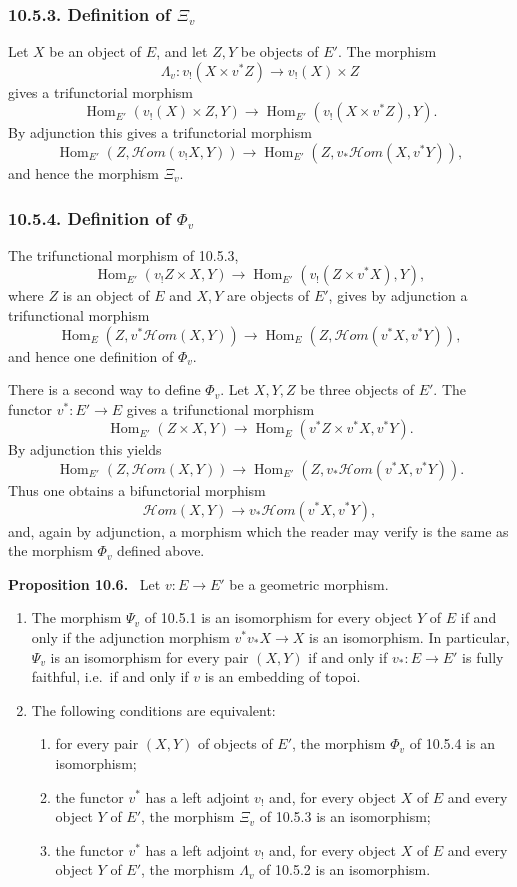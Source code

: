 \documentclass[11pt]{article}
\newcommand{\Hom}{\operatorname{Hom}}
\newcommand{\scrHom}{\mathscr{H}\!om}
\newcommand{\ie}{i.e.}
\newenvironment{statement}[1]{\par\medskip\noindent\textbf{#1.}\ }{\par\medskip}
\begin{document}
\subsubsection*{10.5.3. Definition of $\Xi_v$}
Let $X$ be an object of $E$, and let $Z,Y$ be objects of $E'$. The morphism
\[
\Lambda_v:v_!(X\times v^*Z)\to v_!(X)\times Z
\]
gives a trifunctorial morphism
\[
\Hom_{E'}(v_!(X)\times Z,Y)\longrightarrow
\Hom_{E'}(v_!(X\times v^*Z),Y).
\]
By adjunction this gives a trifunctorial morphism
\[
\Hom_{E'}(Z,\scrHom(v_!X,Y))\longrightarrow
\Hom_{E'}(Z,v_*\scrHom(X,v^*Y)),
\]
and hence the morphism $\Xi_v$.

\subsubsection*{10.5.4. Definition of $\Phi_v$}
The trifunctional morphism of 10.5.3,
\[
\Hom_{E'}(v_!Z\times X,Y)\longrightarrow \Hom_{E'}(v_!(Z\times v^*X),Y),
\]
where $Z$ is an object of $E$ and $X,Y$ are objects of $E'$, gives by adjunction a trifunctional morphism
\[
\Hom_E(Z,v^*\scrHom(X,Y))\longrightarrow
\Hom_E(Z,\scrHom(v^*X,v^*Y)),
\]
and hence one definition of $\Phi_v$.

There is a second way to define $\Phi_v$. Let $X,Y,Z$ be three objects of $E'$. The functor $v^*:E'\to E$ gives a trifunctional morphism
\[
\Hom_{E'}(Z\times X,Y)\longrightarrow
\Hom_E(v^*Z\times v^*X,v^*Y).
\]
By adjunction this yields
\[
\Hom_{E'}(Z,\scrHom(X,Y))\longrightarrow
\Hom_{E'}(Z,v_*\scrHom(v^*X,v^*Y)).
\]
Thus one obtains a bifunctorial morphism
\[
\scrHom(X,Y)\longrightarrow v_*\scrHom(v^*X,v^*Y),
\]
and, again by adjunction, a morphism which the reader may verify is the same as the morphism $\Phi_v$ defined above.

\begin{statement}{Proposition 10.6}
Let $v:E\to E'$ be a geometric morphism.
\begin{enumerate}[label=\arabic*)]
\item The morphism $\Psi_v$ of 10.5.1 is an isomorphism for every object $Y$ of $E$ if and only if the adjunction morphism $v^*v_*X\to X$ is an isomorphism. In particular, $\Psi_v$ is an isomorphism for every pair $(X,Y)$ if and only if $v_*:E\to E'$ is fully faithful, \ie\ if and only if $v$ is an embedding of topoi.
\item The following conditions are equivalent:
\begin{enumerate}[label=(\roman*)]
\item for every pair $(X,Y)$ of objects of $E'$, the morphism $\Phi_v$ of 10.5.4 is an isomorphism;
\item the functor $v^*$ has a left adjoint $v_!$ and, for every object $X$ of $E$ and every object $Y$ of $E'$, the morphism $\Xi_v$ of 10.5.3 is an isomorphism;
\item the functor $v^*$ has a left adjoint $v_!$ and, for every object $X$ of $E$ and every object $Y$ of $E'$, the morphism $\Lambda_v$ of 10.5.2 is an isomorphism.
\end{enumerate}
\end{enumerate}
\end{statement}
\end{document}
